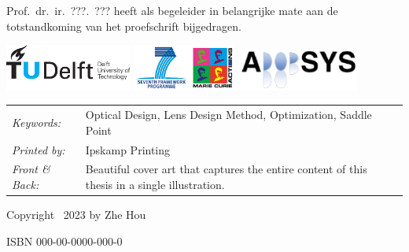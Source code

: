\begin{titlepage}
\medskip
\noindent Prof.\ dr.\ ir.\ ???.\ ??? heeft als begeleider in belangrijke mate aan de totstandkoming van het proefschrift bijgedragen.

\vfill
\begin{center}
    \includegraphics[height=0.6in]{title/logos/tudelftpng}
    \hspace{2em}
    \includegraphics[height=0.6in]{title/logos/marie-curie}
    \hspace{2em}
    \includegraphics[height=0.55in]{title/logos/adopsys}
\end{center}
\vfill

\noindent
\begin{tabular}{@{}p{}@{}p{}}
    \textit{Keywords:} & Optical Design, Lens Design Method, Optimization, Saddle Point \\[\medskipamount]
    \textit{Printed by:} & Ipskamp Printing \\[\medskipamount]
    \textit{Front \& Back:} & Beautiful cover art that captures the entire content of this thesis in a single illustration.
\end{tabular}

\vspace{4\bigskipamount}

\noindent Copyright \textcopyright\ 2023 by Zhe Hou


\medskip
\noindent ISBN 000-00-0000-000-0


\end{titlepage}
